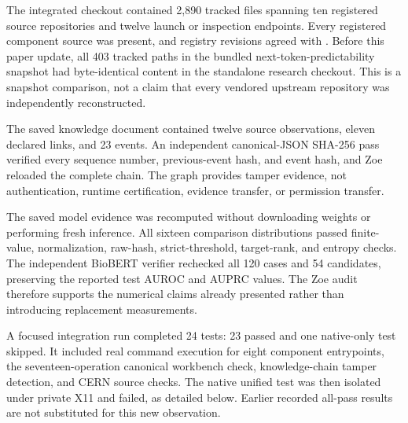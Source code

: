 \documentclass[11pt,a4paper]{article}
\begin{document}
The integrated checkout contained 2,890 tracked files spanning ten registered source repositories and twelve launch or inspection endpoints. Every registered component source was present, and registry revisions agreed with . Before this paper update, all 403 tracked paths in the bundled next-token-predictability snapshot had byte-identical content in the standalone research checkout. This is a snapshot comparison, not a claim that every vendored upstream repository was independently reconstructed.

The saved knowledge document contained twelve source observations, eleven declared links, and 23 events. An independent canonical-JSON SHA-256 pass verified every sequence number, previous-event hash, and event hash, and Zoe reloaded the complete chain. The graph provides tamper evidence, not authentication, runtime certification, evidence transfer, or permission transfer.

The saved model evidence was recomputed without downloading weights or performing fresh inference. All sixteen comparison distributions passed finite-value, normalization, raw-hash, strict-threshold, target-rank, and entropy checks. The independent BioBERT verifier rechecked all 120 cases and 54 candidates, preserving the reported test AUROC and AUPRC values. The Zoe audit therefore supports the numerical claims already presented rather than introducing replacement measurements.

A focused integration run completed 24 tests: 23 passed and one native-only test skipped. It included real command execution for eight component entrypoints, the seventeen-operation canonical workbench check, knowledge-chain tamper detection, and CERN source checks. The native unified test was then isolated under private X11 and failed, as detailed below. Earlier recorded all-pass results are not substituted for this new observation.
\end{document}

